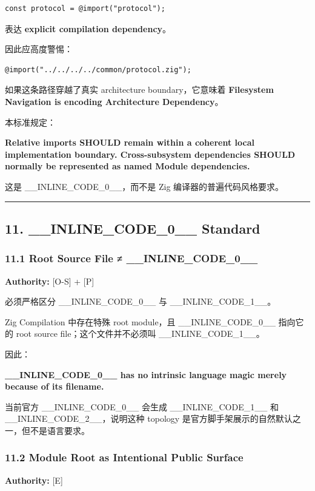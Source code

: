 \documentclass[11pt,a4paper]{article}
\begin{document}
\begin{lstlisting}[language=zig]
const protocol = @import("protocol");
\end{lstlisting}
表达 \textbf{explicit compilation dependency}。

因此应高度警惕：

\begin{lstlisting}[language=zig]
@import("../../../../common/protocol.zig");
\end{lstlisting}
如果这条路径穿越了真实 architecture boundary，它意味着 \textbf{Filesystem Navigation is encoding Architecture Dependency}。

本标准规定：

\begin{gfmBlockquote}
\textbf{Relative imports SHOULD remain within a coherent local implementation boundary. Cross-subsystem dependencies SHOULD normally be represented as named Module dependencies.}
\end{gfmBlockquote}
这是 \_\_INLINE\_CODE\_0\_\_，而不是 Zig 编译器的普遍代码风格要求。

\vspace{0.5em}\hrule\vspace{0.5em}
\subsection{11. \_\_INLINE\_CODE\_0\_\_ Standard}
\subsubsection{11.1 Root Source File ≠ \_\_INLINE\_CODE\_0\_\_}
\textbf{Authority:} [O-S] + [P]

必须严格区分 \_\_INLINE\_CODE\_0\_\_ 与 \_\_INLINE\_CODE\_1\_\_。

Zig Compilation 中存在特殊 root module，且 \_\_INLINE\_CODE\_0\_\_ 指向它的 root source file；这个文件并不必须叫 \_\_INLINE\_CODE\_1\_\_。

因此：

\begin{gfmBlockquote}
\textbf{\_\_INLINE\_CODE\_0\_\_ has no intrinsic language magic merely because of its filename.}
\end{gfmBlockquote}
当前官方 \_\_INLINE\_CODE\_0\_\_ 会生成 \_\_INLINE\_CODE\_1\_\_ 和 \_\_INLINE\_CODE\_2\_\_，说明这种 topology 是官方脚手架展示的自然默认之一，但不是语言要求。

\subsubsection{11.2 Module Root as Intentional Public Surface}
\textbf{Authority:} [E]
\end{document}
